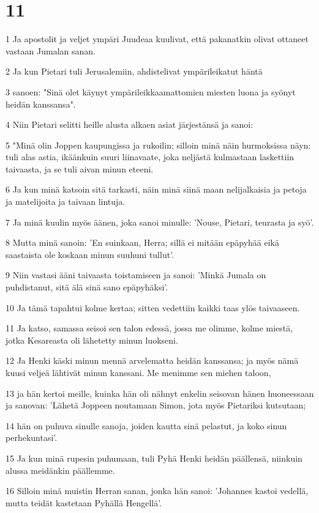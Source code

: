 \chapter{11}

\par 1 Ja apostolit ja veljet ympäri Juudeaa kuulivat, että pakanatkin olivat ottaneet vastaan Jumalan sanan.
\par 2 Ja kun Pietari tuli Jerusalemiin, ahdistelivat ympärileikatut häntä
\par 3 sanoen: "Sinä olet käynyt ympärileikkaamattomien miesten luona ja syönyt heidän kanssansa".
\par 4 Niin Pietari selitti heille alusta alkaen asiat järjestänsä ja sanoi:
\par 5 "Minä olin Joppen kaupungissa ja rukoilin; silloin minä näin hurmoksissa näyn: tuli alas astia, ikäänkuin suuri liinavaate, joka neljästä kulmastaan laskettiin taivaasta, ja se tuli aivan minun eteeni.
\par 6 Ja kun minä katsoin sitä tarkasti, näin minä siinä maan nelijalkaisia ja petoja ja matelijoita ja taivaan lintuja.
\par 7 Ja minä kuulin myös äänen, joka sanoi minulle: 'Nouse, Pietari, teurasta ja syö'.
\par 8 Mutta minä sanoin: 'En suinkaan, Herra; sillä ei mitään epäpyhää eikä saastaista ole koskaan minun suuhuni tullut'.
\par 9 Niin vastasi ääni taivaasta toistamiseen ja sanoi: 'Minkä Jumala on puhdistanut, sitä älä sinä sano epäpyhäksi'.
\par 10 Ja tämä tapahtui kolme kertaa; sitten vedettiin kaikki taas ylös taivaaseen.
\par 11 Ja katso, samassa seisoi sen talon edessä, jossa me olimme, kolme miestä, jotka Kesareasta oli lähetetty minun luokseni.
\par 12 Ja Henki käski minun mennä arvelematta heidän kanssansa; ja myös nämä kuusi veljeä lähtivät minun kanssani. Me menimme sen miehen taloon,
\par 13 ja hän kertoi meille, kuinka hän oli nähnyt enkelin seisovan hänen huoneessaan ja sanovan: 'Lähetä Joppeen noutamaan Simon, jota myös Pietariksi kutsutaan;
\par 14 hän on puhuva sinulle sanoja, joiden kautta sinä pelastut, ja koko sinun perhekuntasi'.
\par 15 Ja kun minä rupesin puhumaan, tuli Pyhä Henki heidän päällensä, niinkuin alussa meidänkin päällemme.
\par 16 Silloin minä muistin Herran sanan, jonka hän sanoi: 'Johannes kastoi vedellä, mutta teidät kastetaan Pyhällä Hengellä'.
